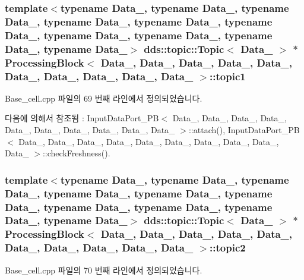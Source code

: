 \subsubsection[{\texorpdfstring{topic1}{topic1}}]{\setlength{\rightskip}{0pt plus 5cm}template$<$typename Data\+\_, typename Data\+\_, typename Data\+\_, typename Data\+\_, typename Data\+\_, typename Data\+\_, typename Data\+\_, typename Data\+\_, typename Data\+\_, typename Data\+\_$>$ dds\+::topic\+::\+Topic$<$ Data\+\_ $>$ $\ast$ {\bf Processing\+Block}$<$ Data\+\_, Data\+\_, Data\+\_, Data\+\_, Data\+\_, Data\+\_, Data\+\_, Data\+\_, Data\+\_, Data\+\_ $>$\+::topic1}\hypertarget{classProcessingBlock_abd3ca285d8e6231566b7a9b7e2a9f386}{}\label{classProcessingBlock_abd3ca285d8e6231566b7a9b7e2a9f386}


Base\+\_\+cell.\+cpp 파일의 69 번째 라인에서 정의되었습니다.



다음에 의해서 참조됨 \+:  Input\+Data\+Port\+\_\+\+P\+B$<$ Data\+\_, Data\+\_, Data\+\_, Data\+\_, Data\+\_, Data\+\_, Data\+\_, Data\+\_, Data\+\_, Data\+\_ $>$\+::attach(), Input\+Data\+Port\+\_\+\+P\+B$<$ Data\+\_, Data\+\_, Data\+\_, Data\+\_, Data\+\_, Data\+\_, Data\+\_, Data\+\_, Data\+\_, Data\+\_ $>$\+::check\+Freshness().

\subsubsection[{\texorpdfstring{topic2}{topic2}}]{\setlength{\rightskip}{0pt plus 5cm}template$<$typename Data\+\_, typename Data\+\_, typename Data\+\_, typename Data\+\_, typename Data\+\_, typename Data\+\_, typename Data\+\_, typename Data\+\_, typename Data\+\_, typename Data\+\_$>$ dds\+::topic\+::\+Topic$<$ Data\+\_ $>$ $\ast$ {\bf Processing\+Block}$<$ Data\+\_, Data\+\_, Data\+\_, Data\+\_, Data\+\_, Data\+\_, Data\+\_, Data\+\_, Data\+\_, Data\+\_ $>$\+::topic2}\hypertarget{classProcessingBlock_a404e2a175190e51bd9342b21736c08a3}{}\label{classProcessingBlock_a404e2a175190e51bd9342b21736c08a3}


Base\+\_\+cell.\+cpp 파일의 70 번째 라인에서 정의되었습니다.



